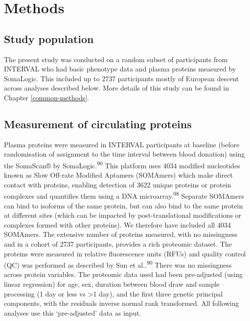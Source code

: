 \documentclass[11pt,twoside]{bristolthesis}
\begin{document}
\hypertarget{methods-3}{%
\section{Methods}\label{methods-3}}

\hypertarget{study-population-2}{%
\subsection{Study population}\label{study-population-2}}

The present study was conducted on a random subset of participants from INTERVAL who had basic phenotype data and plasma proteins measured by SomaLogic. This included up to 2737 participants mostly of European descent across analyses described below. More details of this study can be found in Chapter \ref{common-methods}.

\hypertarget{measurement-of-circulating-proteins}{%
\subsection{Measurement of circulating proteins}\label{measurement-of-circulating-proteins}}

Plasma proteins were measured in INTERVAL participants at baseline (before randomisation of assignment to the time interval between blood donation) using the SomaScan® by SomaLogic.\textsuperscript{90} This platform uses 4034 modified nucleotides known as Slow Off-rate Modified Aptamers (SOMAmers) which make direct contact with proteins, enabling detection of 3622 unique proteins or protein complexes and quantifies them using a DNA microarray.\textsuperscript{98} Separate SOMAmers can bind to isoforms of the same protein, but can also bind to the same protein at different sites (which can be impacted by post-translational modifications or complexes formed with other proteins). We therefore have included all 4034 SOMAmers. The extensive number of proteins measured, with no missingness and in a cohort of 2737 participants, provides a rich proteomic dataset. The proteins were measured in relative fluorescence units (RFUs) and quality control (QC) was performed as described by Sun et al..\textsuperscript{90} There was no missingness across protein variables. The proteomic data used had been pre-adjusted (using linear regression) for age, sex, duration between blood draw and sample processing (1 day or less vs \textgreater1 day), and the first three genetic principal components, with the residuals inverse normal rank transformed. All following analyses use this `pre-adjusted' data as input.
\end{document}
